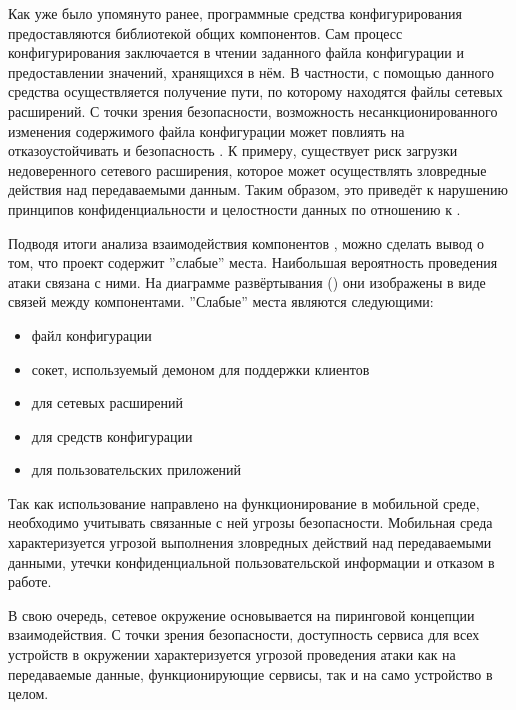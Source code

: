 %
Как уже было упомянуто ранее, программные средства конфигурирования  предоставляются библиотекой общих компонентов. 
%
Сам процесс конфигурирования заключается в чтении заданного файла конфигурации и предоставлении значений, хранящихся в нём. 
%
В частности, с помощью данного средства осуществляется получение пути, по которому находятся файлы сетевых расширений. 
%
С точки зрения безопасности, возможность несанкционированного изменения содержимого файла конфигурации может повлиять на отказоустойчивать и безопасность . 
%
К примеру, существует риск загрузки недоверенного сетевого расширения, которое может осуществлять зловредные действия над передаваемыми данным.
%
Таким образом, это приведёт к нарушению принципов конфиденциальности и целостности данных по отношению к . 

%
Подводя итоги анализа взаимодействия компонентов , можно сделать вывод о том, что проект содержит ''слабые'' места. Наибольшая вероятность проведения атаки связана с ними. На диаграмме развёртывания  () они изображены в виде связей между компонентами. ''Слабые'' места  являются следующими:
\begin{itemize}
	\setlength{\itemsep}{0pt}%

	\item файл конфигурации
	\item сокет, используемый демоном для поддержки клиентов
	\item {} для сетевых расширений
	\item {} для средств конфигурации
	\item {} для пользовательских приложений
\end{itemize}

%
Так как использование  направлено на функционирование в мобильной среде, необходимо учитывать связанные с ней угрозы безопасности. 
%
Мобильная среда характеризуется угрозой выполнения зловредных действий над передаваемыми данными, утечки конфиденциальной пользовательской информации и отказом  в работе. 

%
В свою очередь, сетевое окружение  основывается на пиринговой концепции взаимодействия. 
%
С точки зрения безопасности, доступность сервиса для всех устройств в окружении характеризуется угрозой проведения атаки как на передаваемые данные, функционирующие сервисы, так и на само устройство в целом. 

